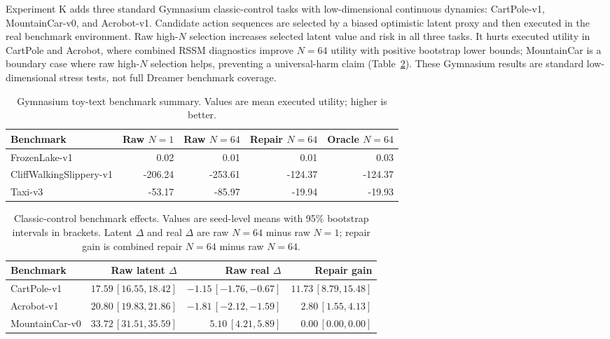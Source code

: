 \documentclass{article}
\begin{document}
Experiment K adds three standard Gymnasium classic-control tasks with low-dimensional continuous dynamics: CartPole-v1, MountainCar-v0, and Acrobot-v1. Candidate action sequences are selected by a biased optimistic latent proxy and then executed in the real benchmark environment. Raw high-\(N\) selection increases selected latent value and risk in all three tasks. It hurts executed utility in CartPole and Acrobot, where combined RSSM diagnostics improve \(N=64\) utility with positive bootstrap lower bounds; MountainCar is a boundary case where raw high-\(N\) selection helps, preventing a universal-harm claim (Table~\ref{tab:classic-control-main}). These Gymnasium results are standard low-dimensional stress tests, not full Dreamer benchmark coverage.

\begin{table}[t]
\centering
\caption{Gymnasium toy-text benchmark summary. Values are mean executed utility; higher is better.}
\label{tab:gym-main}
\begin{tabular}{lrrrr}
\toprule
Benchmark & Raw \(N=1\) & Raw \(N=64\) & Repair \(N=64\) & Oracle \(N=64\) \\
\midrule
FrozenLake-v1 & 0.02 & 0.01 & 0.01 & 0.03 \\
CliffWalkingSlippery-v1 & -206.24 & -253.61 & -124.37 & -124.37 \\
Taxi-v3 & -53.17 & -85.97 & -19.94 & -19.93 \\
\bottomrule
\end{tabular}
\end{table}

\begin{table}[t]
\centering
\caption{Classic-control benchmark effects. Values are seed-level means with 95\% bootstrap intervals in brackets. Latent \(\Delta\) and real \(\Delta\) are raw \(N=64\) minus raw \(N=1\); repair gain is combined repair \(N=64\) minus raw \(N=64\).}
\label{tab:classic-control-main}
\begin{tabular}{lrrr}
\toprule
Benchmark & Raw latent \(\Delta\) & Raw real \(\Delta\) & Repair gain \\
\midrule
CartPole-v1 & \(17.59\,[16.55,18.42]\) & \(-1.15\,[-1.76,-0.67]\) & \(11.73\,[8.79,15.48]\) \\
Acrobot-v1 & \(20.80\,[19.83,21.86]\) & \(-1.81\,[-2.12,-1.59]\) & \(2.80\,[1.55,4.13]\) \\
MountainCar-v0 & \(33.72\,[31.51,35.59]\) & \(5.10\,[4.21,5.89]\) & \(0.00\,[0.00,0.00]\) \\
\bottomrule
\end{tabular}
\end{table}
\end{document}

